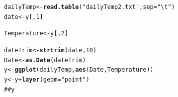 \documentclass{article}\usepackage{graphicx, color}
\makeatletter
\newcommand{\hlfunctioncall}[1]{\textcolor[rgb]{0.501960784313725,0,0.329411764705882}{\textbf{#1}}}%
\newcommand{\hlstring}[1]{\textcolor[rgb]{0.6,0.6,1}{#1}}%
\newcommand{\hlcomment}[1]{\textcolor[rgb]{0.180392156862745,0.6,0.341176470588235}{#1}}%
\newenvironment{kframe}{%
 \def\at@end@of@kframe{}%
 \ifinner\ifhmode%
  \def\at@end@of@kframe{\end{minipage}}%
  \begin{minipage}{\columnwidth}%
 \fi\fi%
 \def\FrameCommand##1{\hskip\@totalleftmargin \hskip-\fboxsep
 \colorbox{shadecolor}{##1}\hskip-\fboxsep
     \hskip-\linewidth \hskip-\@totalleftmargin \hskip\columnwidth}%
 \MakeFramed {\advance\hsize-\width
   \@totalleftmargin\z@ \linewidth\hsize
   \@setminipage}}%
 {\par\unskip\endMakeFramed%
 \at@end@of@kframe}
\newenvironment{knitrout}{}{} %
\makeatother
\begin{document}
\begin{knitrout}
\color{fgcolor}\begin{kframe}
\begin{alltt}
dailyTemp <- \hlfunctioncall{read.table}(\hlstring{"dailyTemp2.txt"}, sep = \hlstring{"\textbackslash{}t"})
date <- y[, 1]
\end{alltt}


{\ttfamily\noindent\bfseries\color{errorcolor}{\#\# Error: incorrect number of dimensions}}\begin{alltt}
Temperature <- y[, 2]
\end{alltt}


{\ttfamily\noindent\bfseries\color{errorcolor}{\#\# Error: incorrect number of dimensions}}\begin{alltt}
dateTrim <- \hlfunctioncall{strtrim}(date, 10)
Date <- \hlfunctioncall{as.Date}(dateTrim)
y <- \hlfunctioncall{ggplot}(dailyTemp, \hlfunctioncall{aes}(Date, Temperature))
y <- y + \hlfunctioncall{layer}(geom = \hlstring{"point"})
\hlcomment{## y}
\end{alltt}
\end{kframe}
\end{knitrout}
\end{document}

